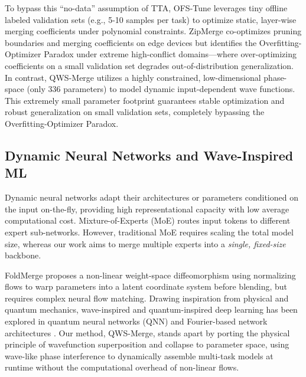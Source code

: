 To bypass this ``no-data'' assumption of TTA, OFS-Tune \cite{ofstune} leverages tiny offline labeled validation sets (e.g., 5-10 samples per task) to optimize static, layer-wise merging coefficients under polynomial constraints. ZipMerge \cite{zipmerge} co-optimizes pruning boundaries and merging coefficients on edge devices but identifies the Overfitting-Optimizer Paradox under extreme high-conflict domains—where over-optimizing coefficients on a small validation set degrades out-of-distribution generalization. In contrast, QWS-Merge utilizes a highly constrained, low-dimensional phase-space (only 336 parameters) to model dynamic input-dependent wave functions. This extremely small parameter footprint guarantees stable optimization and robust generalization on small validation sets, completely bypassing the Overfitting-Optimizer Paradox.

\subsection{Dynamic Neural Networks and Wave-Inspired ML}
Dynamic neural networks adapt their architectures or parameters conditioned on the input on-the-fly, providing high representational capacity with low average computational cost. Mixture-of-Experts (MoE) \cite{shazeer2017outrageously, fedus2022switch} routes input tokens to different expert sub-networks. However, traditional MoE requires scaling the total model size, whereas our work aims to merge multiple experts into a \emph{single, fixed-size} backbone.

FoldMerge \cite{foldmerge} proposes a non-linear weight-space diffeomorphism using normalizing flows to warp parameters into a latent coordinate system before blending, but requires complex neural flow matching. Drawing inspiration from physical and quantum mechanics, wave-inspired and quantum-inspired deep learning has been explored in quantum neural networks (QNN) \cite{beer2020training} and Fourier-based network architectures \cite{guibas2021adaptive}. Our method, QWS-Merge, stands apart by porting the physical principle of wavefunction superposition and collapse to parameter space, using wave-like phase interference to dynamically assemble multi-task models at runtime without the computational overhead of non-linear flows.

